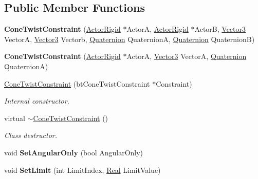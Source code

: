 \subsection*{Public Member Functions}
\begin{DoxyCompactItemize}
\item 
\hypertarget{classphys_1_1ConeTwistConstraint_ab72e1489ea91e47ebbeee41dee116040}{
{\bfseries ConeTwistConstraint} (\hyperlink{classphys_1_1ActorRigid}{ActorRigid} $\ast$ActorA, \hyperlink{classphys_1_1ActorRigid}{ActorRigid} $\ast$ActorB, \hyperlink{classphys_1_1Vector3}{Vector3} VectorA, \hyperlink{classphys_1_1Vector3}{Vector3} Vectorb, \hyperlink{classphys_1_1Quaternion}{Quaternion} QuaternionA, \hyperlink{classphys_1_1Quaternion}{Quaternion} QuaternionB)}
\label{da/dbc/classphys_1_1ConeTwistConstraint_ab72e1489ea91e47ebbeee41dee116040}

\item 
\hypertarget{classphys_1_1ConeTwistConstraint_ab9c2ee7346f1b862d508cbefe22e54e0}{
{\bfseries ConeTwistConstraint} (\hyperlink{classphys_1_1ActorRigid}{ActorRigid} $\ast$ActorA, \hyperlink{classphys_1_1Vector3}{Vector3} VectorA, \hyperlink{classphys_1_1Quaternion}{Quaternion} QuaternionA)}
\label{da/dbc/classphys_1_1ConeTwistConstraint_ab9c2ee7346f1b862d508cbefe22e54e0}

\item 
\hyperlink{classphys_1_1ConeTwistConstraint_a38a9a0e7676d8ad8f77831a319bc007b}{ConeTwistConstraint} (btConeTwistConstraint $\ast$Constraint)
\begin{DoxyCompactList}\small\item\em Internal constructor. \item\end{DoxyCompactList}\item 
virtual \hyperlink{classphys_1_1ConeTwistConstraint_aae5d4aeeff871a2ec79bdb7d493588df}{$\sim$ConeTwistConstraint} ()
\begin{DoxyCompactList}\small\item\em Class destructor. \item\end{DoxyCompactList}\item 
\hypertarget{classphys_1_1ConeTwistConstraint_a1e2ffb465a8ceab4b77663b9e446a3ae}{
void {\bfseries SetAngularOnly} (bool AngularOnly)}
\label{da/dbc/classphys_1_1ConeTwistConstraint_a1e2ffb465a8ceab4b77663b9e446a3ae}

\item 
\hypertarget{classphys_1_1ConeTwistConstraint_ae8519afb837606a39dfaef447ae96888}{
void {\bfseries SetLimit} (int LimitIndex, \hyperlink{namespacephys_af7eb897198d265b8e868f45240230d5f}{Real} LimitValue)}
\label{da/dbc/classphys_1_1ConeTwistConstraint_ae8519afb837606a39dfaef447ae96888}


\end{DoxyCompactItemize}
